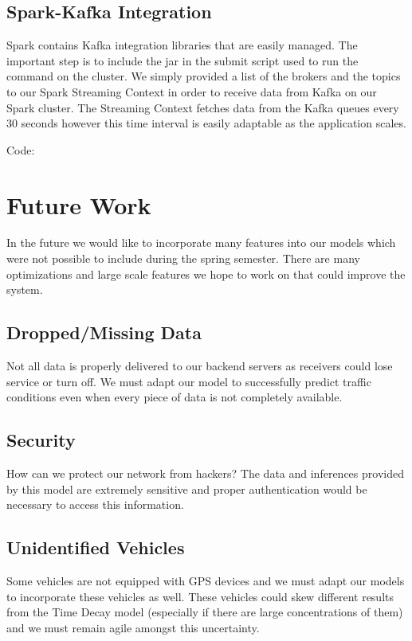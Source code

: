 \documentclass{vldb}
\begin{document}
\subsection{Spark-Kafka Integration}

Spark contains Kafka integration libraries that are easily managed. The important step is to include the jar in the submit script used to run the command on the cluster. We simply provided a list of the brokers and the topics to our Spark Streaming Context in order to receive data from Kafka on our Spark cluster. The Streaming Context fetches data from the Kafka queues every 30 seconds however this time interval is easily adaptable as the application scales. 

Code:




\section{Future Work}

In the future we would like to incorporate many features into our models which were not possible to include during the spring semester. There are many optimizations and large scale features we hope to work on that could improve the system. 

\subsection{Dropped/Missing Data}
Not all data is properly delivered to our backend servers as receivers could lose service or turn off. We must adapt our model to successfully predict traffic conditions even when every piece of data is not completely available.

\subsection{Security}
How can we protect our network from hackers? The data and inferences provided by this model are extremely sensitive and proper authentication would be necessary to access this information. 

\subsection{Unidentified Vehicles}
Some vehicles are not equipped with GPS devices and we must adapt our models to incorporate these vehicles as well. These vehicles could skew different results from the Time Decay model (especially if there are large concentrations of them) and we must remain agile amongst this uncertainty. 
\end{document}
